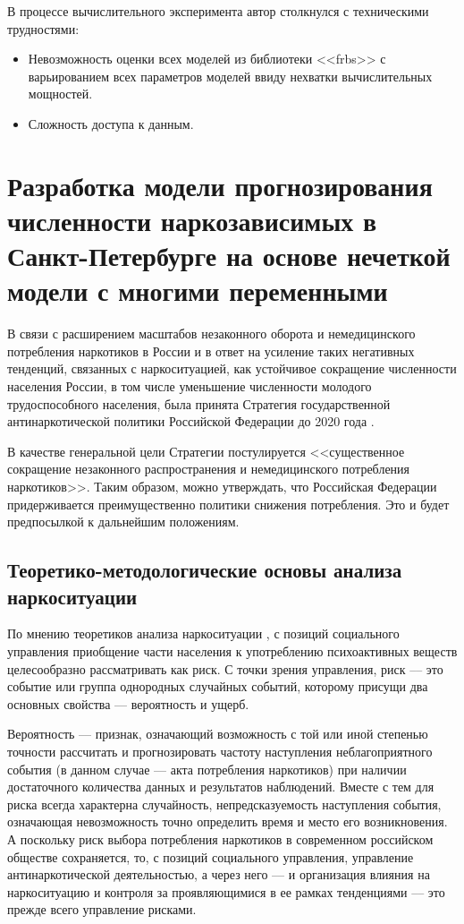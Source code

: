 В процессе вычислительного эксперимента автор столкнулся с техническими трудностями:
\begin{itemize}
	\item Невозможность оценки всех моделей из библиотеки <<frbs>> с варьированием всех параметров моделей ввиду нехватки вычислительных мощностей.
	\item Сложность доступа к данным.  
\end{itemize}
	

\section{Разработка модели прогнозирования численности наркозависимых в 
    Санкт-Петербурге на основе нечеткой модели с многими переменными}

В связи с расширением масштабов незаконного оборота и немедицинского потребления 
наркотиков  в России и в ответ на усиление таких негативных тенденций, связанных 
с наркоситуацией, как устойчивое сокращение численности населения России, в том 
числе уменьшение численности молодого трудоспособного населения, была принята 
Стратегия государственной антинаркотической политики
Российской Федерации до 2020 года \cite{ru_nat_drug_strat}. 

В качестве генеральной цели Стратегии постулируется <<существенное сокращение 
незаконного распространения и немедицинского потребления наркотиков>>. Таким 
образом, можно утверждать, что Российская Федерации придерживается 
преимущественно политики снижения потребления. Это и будет предпосылкой к 
дальнейшим положениям.

\subsection{Теоретико-методологические основы анализа наркоситуации}

По мнению теоретиков анализа наркоситуации \cite{Karpets2010}, с позиций
социального управления приобщение части населения к употреблению психоактивных
веществ целесообразно рассматривать как риск. С точки зрения управления, риск
–-- это событие или группа однородных случайных событий, которому присущи два
основных свойства --– вероятность и ущерб.

Вероятность –-- признак, означающий возможность с той или иной степенью точности
рассчитать и прогнозировать частоту наступления неблагоприятного события (в
данном случае --– акта потребления наркотиков) при наличии достаточного
количества данных и результатов наблюдений. Вместе с тем для риска всегда
характерна случайность, непредсказуемость наступления события, означающая
невозможность точно определить время и место его возникновения. А поскольку риск
выбора потребления наркотиков в современном российском обществе сохраняется, то,
с позиций социального управления, управление антинаркотической деятельностью, а
через него –-- и организация влияния на наркоситуацию и контроля за
проявляющимися в ее рамках тенденциями –-- это прежде всего управление рисками.

